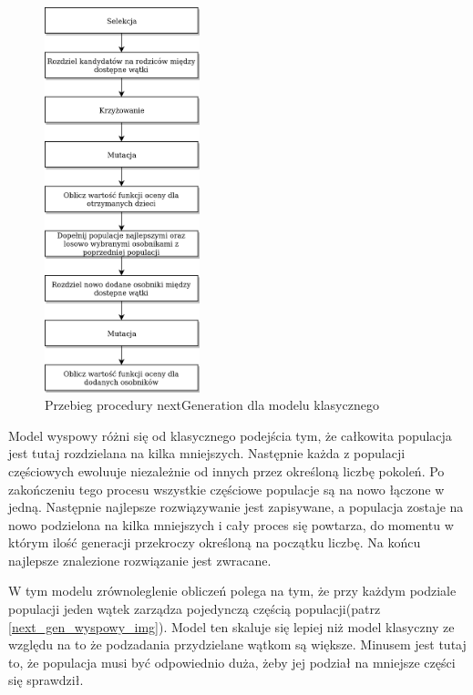 \begin{figure}[H]
    \centering        
    \includegraphics[width=0.4\textwidth]{img/next_gen_klasyczny.png}
    \caption{Przebieg procedury nextGeneration dla modelu klasycznego}
    \label{next_gen_klasyczny_img}
\end{figure}

Model wyspowy różni się od klasycznego podejścia tym, że całkowita populacja jest tutaj rozdzielana na kilka mniejszych. Następnie każda z 
populacji częściowych ewoluuje niezależnie od innych przez określoną liczbę pokoleń. Po zakończeniu tego procesu wszystkie częściowe populacje 
są na nowo łączone w jedną. Następnie najlepsze rozwiązywanie jest zapisywane, a populacja zostaje na nowo podzielona na kilka mniejszych i 
cały proces się powtarza, do momentu w którym ilość generacji przekroczy określoną na początku liczbę. Na końcu najlepsze znalezione rozwiązanie 
jest zwracane.

W tym modelu zrównoleglenie obliczeń polega na tym, że przy każdym podziale populacji jeden wątek zarządza pojedynczą częścią populacji(patrz \ref{next_gen_wyspowy_img}).
Model ten skaluje się lepiej niż model klasyczny ze względu na to że podzadania przydzielane wątkom są większe. Minusem jest tutaj to, że populacja 
musi być odpowiednio duża, żeby jej podział na mniejsze części się sprawdził.

